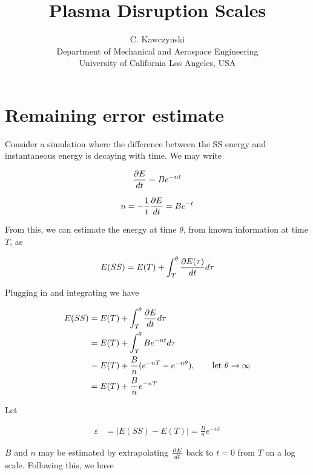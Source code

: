 \documentclass[11pt]{article}
\begin{document}
\doublespacing
\title{Plasma Disruption Scales}
\author{C. Kawczynski \\
Department of Mechanical and Aerospace Engineering \\
University of California Los Angeles, USA\\
}
\maketitle

\section{Remaining error estimate}
Consider a simulation where the difference between the SS energy and instantaneous energy is decaying with time. We may write

\begin{equation}
	\frac{\partial E}{dt} = B e^{-n t}
\end{equation}

\begin{equation}
	n = - \frac{1}{t} \frac{\partial E}{dt} = B e^{- t}
\end{equation}

From this, we can estimate the energy at time $\theta$, from known information at time $T$, as

\begin{equation}
	E(SS) = E(T) + \int_{T}^{\theta} \frac{\partial E(\tau)}{dt} d\tau
\end{equation}

Plugging in and integrating we have

\begin{equation} \begin{aligned}
	E(SS) &= E(T) + \int_{T}^{\theta} \frac{\partial E}{dt} d\tau \\
	      &= E(T) + \int_{T}^{\theta} B e^{-n t} d\tau \\
	      &= E(T) + \frac{B}{n} (e^{-n T} - e^{-n \theta}), \qquad \text{let } \theta \rightarrow \infty \\
	      &= E(T) + \frac{B}{n} e^{-n T} \\
\end{aligned} \end{equation}

Let

\begin{equation} \begin{aligned}
	\varepsilon &= |E(SS)-E(T)| = \frac{B}{n} e^{-n t}
\end{aligned} \end{equation}

$B$ and $n$ may be estimated by extrapolating $\frac{\partial E}{dt}$ back to $t=0$ from $T$ on a log scale. Following this, we have
\end{document}
